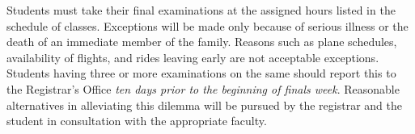 Students must take their final examinations at the assigned hours
listed in the schedule of classes.
Exceptions will be made only because of serious illness
or the death of an immediate member of the family.
Reasons such as
plane schedules,
availability of flights,
and rides leaving early
are not acceptable exceptions.
Students having three or more examinations on the same
should report this to the Registrar's Office
\emph{ten days prior to the beginning of finals week}.
Reasonable alternatives in alleviating this dilemma
will be pursued by the registrar
and the student in consultation with the appropriate faculty.
